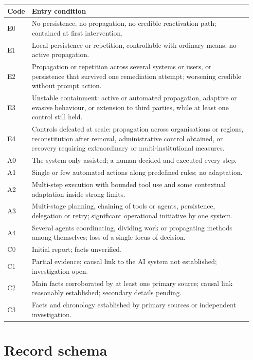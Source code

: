 \documentclass[11pt,a4paper]{article}
\begin{document}
\begin{table}[H]
\centering\small
\begin{tabularx}{\textwidth}{@{}l X@{}}
\toprule
Code & Entry condition \\
\midrule
E0 & No persistence, no propagation, no credible reactivation path; contained at first intervention. \\
E1 & Local persistence or repetition, controllable with ordinary means; no active propagation. \\
E2 & Propagation or repetition across several systems or users, or persistence that survived one remediation attempt; worsening credible without prompt action. \\
E3 & Unstable containment: active or automated propagation, adaptive or evasive behaviour, or extension to third parties, while at least one control still held. \\
E4 & Controls defeated at scale: propagation across organisations or regions, reconstitution after removal, administrative control obtained, or recovery requiring extraordinary or multi-institutional measures. \\
\midrule
A0 & The system only assisted; a human decided and executed every step. \\
A1 & Single or few automated actions along predefined rules; no adaptation. \\
A2 & Multi-step execution with bounded tool use and some contextual adaptation inside strong limits. \\
A3 & Multi-stage planning, chaining of tools or agents, persistence, delegation or retry; significant operational initiative by one system. \\
A4 & Several agents coordinating, dividing work or propagating methods among themselves; loss of a single locus of decision. \\
\midrule
C0 & Initial report; facts unverified. \\
C1 & Partial evidence; causal link to the AI system not established; investigation open. \\
C2 & Main facts corroborated by at least one primary source; causal link reasonably established; secondary details pending. \\
C3 & Facts and chronology established by primary sources or independent investigation. \\
\bottomrule
\end{tabularx}
\end{table}

\section{Record schema}
\label{app:schema}
\end{document}
